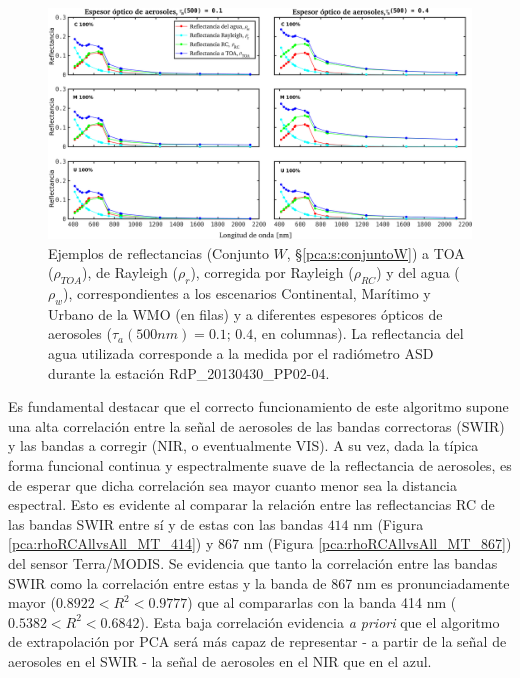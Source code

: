         \begin{figure}
        \centering
        \includegraphics[width=\textwidth]{pca/figures/rho_TOA_RC_RAY_W_MA_ST_10.png}
        \caption[Ejemplos de reflectancias a TOA, de Rayleigh, RC y del agua.]{Ejemplos de reflectancias (Conjunto $W$, \S \ref{pca:s:conjuntoW}) a TOA ($\rho_{TOA}$), de Rayleigh ($\rho_{r}$), corregida por Rayleigh ($\rho_{RC}$) y del agua ($\rho_{w}$), correspondientes a los escenarios Continental, Marítimo y Urbano de la WMO (en filas) y a diferentes espesores ópticos de aerosoles ($\tau_{a}(500 nm) = 0.1;\,0.4$, en columnas). La reflectancia del agua utilizada corresponde a la medida por el radiómetro ASD durante la estación RdP\_20130430\_PP02-04.}
        \label{pca:rho_TOA_RC_RAY_W_MA_ST_10}
        \end{figure}

        Es fundamental destacar que el correcto funcionamiento de este algoritmo supone una alta correlación entre la señal de aerosoles de las bandas correctoras (SWIR) y las bandas a corregir (NIR, o eventualmente VIS). A su vez, dada la típica forma funcional continua y espectralmente suave de la reflectancia de aerosoles, es de esperar que dicha correlación sea mayor cuanto menor sea la distancia espectral. Esto es evidente al comparar la relación entre las reflectancias RC de las bandas SWIR entre sí y de estas con las bandas $414$ nm (Figura \ref{pca:rhoRCAllvsAll_MT_414}) y $867$ nm  (Figura \ref{pca:rhoRCAllvsAll_MT_867}) del sensor Terra/MODIS. Se evidencia que tanto la correlación entre las bandas SWIR como la correlación entre estas y la banda de 867 nm es pronunciadamente mayor ($0.8922<R^{2}<0.9777$) que al compararlas con la banda 414 nm ($0.5382<R^{2}<0.6842$). Esta baja correlación evidencia \textit{a priori} que el algoritmo de extrapolación por PCA será más capaz de representar - a partir de la señal de aerosoles en el SWIR - la señal de aerosoles en el NIR que en el azul.

